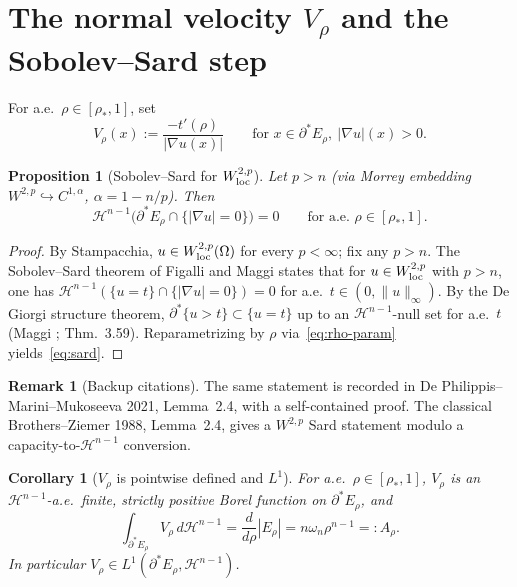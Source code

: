 \documentclass[11pt]{article}
\newtheorem{proposition}[theorem]{Proposition}
\newtheorem{corollary}[theorem]{Corollary}
\theoremstyle{definition}
\newtheorem{remark}[theorem]{Remark}
\newcommand{\Om}{\Omega}
\newcommand{\rstar}{\rho_{*}}
\begin{document}
\section{The normal velocity $V_\rho$ and the Sobolev--Sard step}\label{sec:V}

For a.e.\ $\rho\in[\rstar,1]$, set
\begin{equation}\label{eq:V-def}
   V_\rho(x):=\frac{-t'(\rho)}{|\nabla u(x)|}\qquad
   \text{for }x\in\partial^*E_\rho,\ |\nabla u|(x)>0.
\end{equation}

\begin{proposition}[Sobolev--Sard for $W^{2,p}_{\rm loc}$]\label{prop:sard}
Let $p>n$ (via Morrey embedding $W^{2,p}\hookrightarrow C^{1,\alpha}$,
$\alpha=1-n/p$). Then
\begin{equation}\label{eq:sard}
   \mathcal H^{n-1}\bigl(\partial^*E_\rho\cap\{|\nabla u|=0\}\bigr)=0
   \qquad\text{for a.e.\ }\rho\in[\rstar,1].
\end{equation}
\end{proposition}

\begin{proof}
By Stampacchia, $u\in W^{2,p}_{\rm loc}(\Om)$ for every $p<\infty$; fix any
$p>n$. The Sobolev--Sard theorem of Figalli and Maggi
\cite[Appendix~A, Thm.~A.1]{FigalliMaggi2011} states that for $u\in
W^{2,p}_{\rm loc}$ with $p>n$, one has
$\mathcal H^{n-1}(\{u=t\}\cap\{|\nabla u|=0\})=0$ for a.e.\
$t\in(0,\|u\|_\infty)$. By the De Giorgi structure theorem,
$\partial^*\{u>t\}\subset\{u=t\}$ up to an $\mathcal H^{n-1}$-null set for
a.e.\ $t$ (Maggi \cite[\S 15]{Maggi2012}; \cite{AFP2000} Thm.~3.59).
Reparametrizing by $\rho$ via~\eqref{eq:rho-param} yields~\eqref{eq:sard}.
\end{proof}

\begin{remark}[Backup citations]\label{rem:backup}
The same statement is recorded in De Philippis--Marini--Mukoseeva 2021,
Lemma~2.4, with a self-contained proof. The classical Brothers--Ziemer
1988, Lemma~2.4, gives a $W^{2,p}$ Sard statement modulo a
capacity-to-$\mathcal H^{n-1}$ conversion.
\end{remark}

\begin{corollary}[$V_\rho$ is pointwise defined and $L^1$]\label{cor:V-L1}
For a.e.\ $\rho\in[\rstar,1]$, $V_\rho$ is an $\mathcal H^{n-1}$-a.e.\
finite, strictly positive Borel function on $\partial^*E_\rho$, and
\begin{equation}\label{eq:V-flux}
   \int_{\partial^*E_\rho}V_\rho\,d\mathcal H^{n-1}
   =\frac{d}{d\rho}|E_\rho|=n\omega_n\rho^{n-1}=:A_\rho.
\end{equation}
In particular $V_\rho\in L^1(\partial^*E_\rho,\mathcal H^{n-1})$.
\end{corollary}
\end{document}
